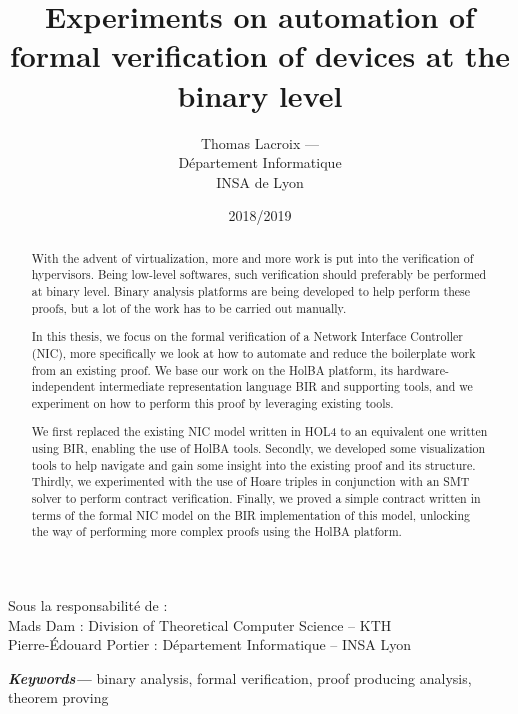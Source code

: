 \documentclass[10pt,a4paper]{article}
\title{Experiments on automation of formal verification of devices at the binary level}
\author{Thomas Lacroix --- \email{thomas.lacroix@insa-lyon.fr}\medskip\\
Département Informatique\\
INSA de Lyon}
\date{2018/2019}
\begin{document}

\maketitle
\thispagestyle{empty}

{
\noindent Sous la responsabilité de :\\
\indent Mads Dam : Division of Theoretical Computer Science -- KTH\\
\indent Pierre-\'Edouard Portier : Département Informatique -- INSA Lyon
}

\vspace{\baselineskip}\vspace{\baselineskip}

{ %
\fontsize{9}{10.8}

\begin{abstract}
  \rightmargin=1cm \leftmargin=1cm
  With the advent of virtualization, more and more work is put into the verification of hypervisors. Being low-level softwares, such verification should preferably be performed at binary level. Binary analysis platforms are being developed to help perform these proofs, but a lot of the work has to be carried out manually.

  In this thesis, we focus on the formal verification of a Network Interface Controller (NIC), more specifically we look at how to automate and reduce the boilerplate work from an existing proof. We base our work on the HolBA platform, its hardware-independent intermediate representation language BIR and supporting tools, and we experiment on how to perform this proof by leveraging existing tools.

  We first replaced the existing NIC model written in HOL4 to an equivalent one written using BIR, enabling the use of HolBA tools. Secondly, we developed some visualization tools to help navigate and gain some insight into the existing proof and its structure. Thirdly, we experimented with the use of Hoare triples in conjunction with an SMT solver to perform contract verification. Finally, we proved a simple contract written in terms of the formal NIC model on the BIR implementation of this model, unlocking the way of performing more complex proofs using the HolBA platform.
\end{abstract}

\leftmargin=1cm
{\small\textbf{\textit{Keywords---}} binary analysis, formal verification, proof producing analysis, theorem proving}

}
\end{document}
